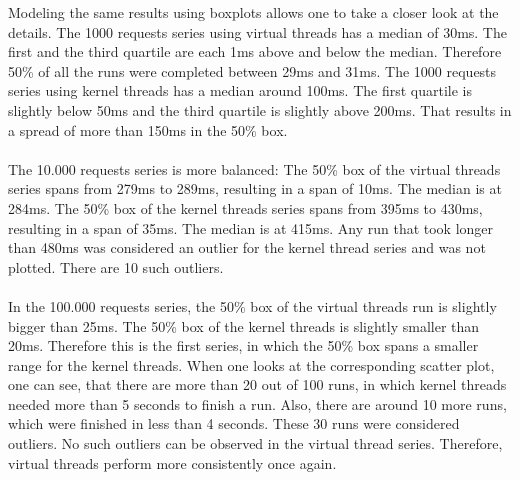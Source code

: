 Modeling the same results using boxplots allows one to take a closer look at the details. The 1000 requests series using virtual threads has a median of 30ms. The first and the third quartile are each 1ms above and below the median. Therefore 50\% of all the runs were completed between 29ms and 31ms. The 1000 requests series using kernel threads has a median around 100ms. The first quartile is slightly below 50ms and the third quartile is slightly above 200ms. That results in a spread of more than 150ms in the 50\% box.
\\
\\
The 10.000 requests series is more balanced: The 50\% box of the virtual threads series spans from 279ms to 289ms, resulting in a span of 10ms. The median is at 284ms. The 50\% box of the kernel threads series spans from 395ms to 430ms, resulting in a span of 35ms. The median is at 415ms. Any run that took longer than 480ms was considered an outlier for the kernel thread series and was not plotted. There are 10 such outliers.
\\
\\
In the 100.000 requests series, the 50\% box of the virtual threads run is slightly bigger than 25ms. The 50\% box of the kernel threads is slightly smaller than 20ms. Therefore this is the first series, in which the 50\% box spans a smaller range for the kernel threads. When one looks at the corresponding scatter plot, one can see, that there are more than 20 out of 100 runs, in which kernel threads needed more than 5 seconds to finish a run. Also, there are around 10 more runs, which were finished in less than 4 seconds. These 30 runs were considered outliers. No such outliers can be observed in the virtual thread series. Therefore, virtual threads perform more consistently once again.

